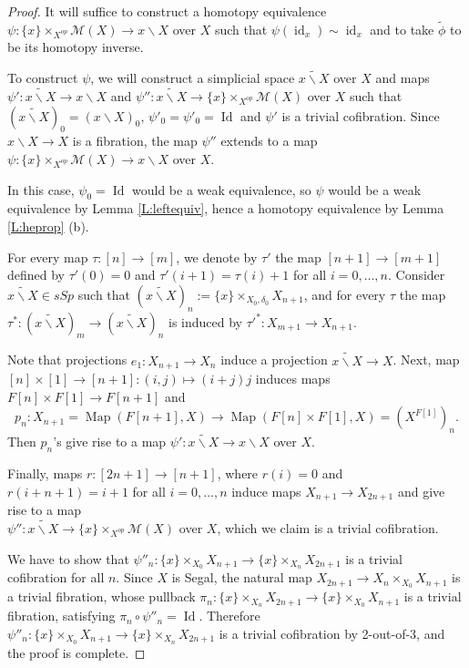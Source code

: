 \documentclass[12pt]{amsart}
\theoremstyle{plain}
\theoremstyle{definition}
\numberwithin{equation}{section}
\newcommand{\cal}[1]{\mathcal{#1}}
\newcommand{\C}[1]{\cal#1}
\newcommand{\wt}{\widetilde}
\newcommand{\dt}{\delta}
\newcommand{\bs}{\backslash}
\newcommand{\rl}[1]{Lemma \ref{L:#1}}
\newcommand{\Map}{\operatorname{Map}}
\newcommand{\id}{\operatorname{id}}
\newcommand{\Id}{\operatorname{Id}}
\begin{document}
\begin{proof}
It will suffice to construct a homotopy equivalence
$\psi:\{x\}\times_{X^{op}}\C{M}(X)\to x\bs X$ over $X$ such that
$\psi(\id_x)\sim \id_x$ and to take $\wt{\phi}$ to be its homotopy
inverse.

To construct $\psi$, we will construct a simplicial space
$\wt{x\bs X}$ over $X$ and maps $\psi':\wt{x\bs X}\to x\bs X$ and
$\psi'':\wt{x\bs X}\to\{x\}\times_{X^{op}}\C{M}(X)$ over $X$ such
that $(\wt{x\bs X})_0=(x\bs X)_0$, $\psi'_0=\psi'_0=\Id$ and
$\psi'$ is a trivial cofibration. Since $x\bs X\to X$ is a
fibration, the map $\psi''$ extends to a map
$\psi:\{x\}\times_{X^{op}}\C{M}(X)\to x\bs X$ over $X$.

In this case, $\psi_0=\Id$ would be a weak equivalence, so $\psi$
would be a weak equivalence by \rl{leftequiv}, hence a homotopy
equivalence by \rl{heprop} (b).

For every map $\tau:[n]\to[m]$, we denote by $\tau'$ the map $[n+1]\to[m+1]$ defined by 
$\tau'(0)=0$ and $\tau'(i+1)=\tau(i)+1$ for all $i=0,\ldots,n$.
Consider $\wt{x\bs X}\in sSp$ such that $(\wt{x\bs
X})_n:=\{x\}\times_{X_0,\dt_0}X_{n+1}$, and for every
$\tau$ the map $\tau^*:(\wt{x\bs X})_m\to(\wt{x\bs
X})_n$ is induced by  $\tau'^*:X_{m+1}\to X_{n+1}$. 

Note that projections $e_1:X_{n+1}\to X_n$ induce a projection $\wt{x\bs X}\to X$.
Next, map $[n]\times[1]\to[n+1]:(i,j)\mapsto(i+j)j$ induces maps 
$F[n]\times F[1]\to
F[n+1]$ and 
\[
p_n: X_{n+1}=\Map(F[n+1],X)\to \Map(F[n]\times F[1],X)=(X^{F[1]})_n.
\] 
Then $p_n$'s give rise to a map $\psi':\wt{x\bs X}\to x\bs X$ over $X$.

Finally, maps $r:[2n+1]\to[n+1]$, where $r(i)=0$ and
$r(i+n+1)=i+1$ for all $i=0,\ldots, n$ induce maps $X_{n+1}\to
X_{2n+1}$ and give rise to a map \\ $\psi'':\wt{x\bs X}\to
\{x\}\times_{X^{op}}\C{M}(X)$ over $X$, which we claim is a trivial
cofibration.

We have to show that $\psi''_n:\{x\}\times_{X_0}X_{n+1}\to
\{x\}\times_{X_n}X_{2n+1}$ is a trivial cofibration for all $n$. Since $X$ is
Segal, the natural map $X_{2n+1}\to X_n\times_{X_0}X_{n+1}$ is a
trivial fibration, whose pullback
$\pi_n:\{x\}\times_{X_n}X_{2n+1}\to\{x\}\times_{X_0}X_{n+1}$ is a
trivial fibration, satisfying $\pi_n\circ \psi''_n=\Id$. Therefore
$\psi''_n:\{x\}\times_{X_0}X_{n+1}\to \{x\}\times_{X_n}X_{2n+1}$
is a trivial cofibration by 2-out-of-3, and the proof is complete.
\end{proof}
\end{document}
